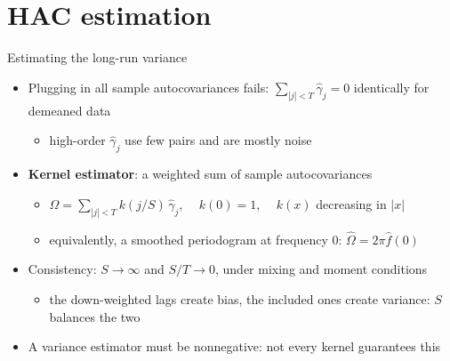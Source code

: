 \section{HAC estimation}

\begin{frame}{Estimating the long-run variance}
\itemsize{\small}
\begin{itemize}
    \item Plugging in all sample autocovariances fails: $\sum_{|j|<T}\hat\gamma_j = 0$ identically for demeaned data
    \begin{itemize}
        \item high-order $\hat\gamma_j$ use few pairs and are mostly noise
    \end{itemize}
    \item \textbf{Kernel estimator}: a weighted sum of sample autocovariances
    \begin{itemize}
        \item $\hat\Omega = \sum_{|j|<T} k(j/S)\,\hat\gamma_j$, $\quad k(0) = 1$, $\quad k(x)$ decreasing in $|x|$
        \item equivalently, a smoothed periodogram at frequency 0: $\hat\Omega = 2\pi\hat f(0)$ 
    \end{itemize}
    \item Consistency: $S \to \infty$ and $S/T \to 0$, under mixing and moment conditions 
    \begin{itemize}
        \item the down-weighted lags create bias, the included ones create variance: $S$ balances the two
    \end{itemize}
    \item A variance estimator must be nonnegative: not every kernel guarantees this
\end{itemize}
\end{frame}


